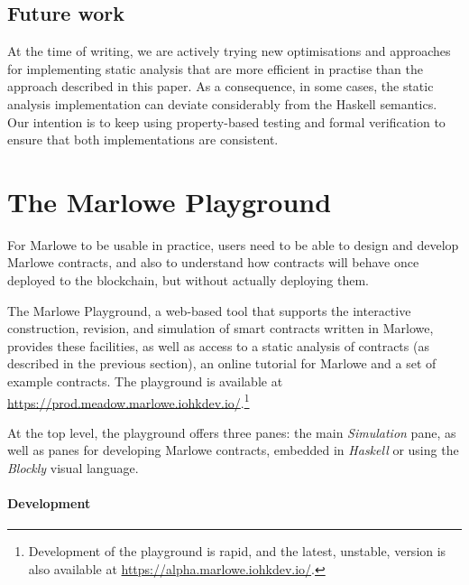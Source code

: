 \documentclass[runningheads]{llncs}
\begin{document}
\subsection{Future work}

At the time of writing, we are actively trying new optimisations and approaches for implementing static analysis that are more efficient in practise than the approach described in this paper. As a consequence, in some cases, the static analysis implementation can deviate considerably from the Haskell semantics. Our intention is to keep using property-based testing and formal verification to ensure that both implementations are consistent.

\section{The Marlowe Playground}
\label{sec:playground}

For Marlowe to be usable in practice, users need to be able to design and develop Marlowe contracts, and also to understand how contracts will behave once deployed to the blockchain, but without actually deploying them.

The Marlowe Playground, a web-based tool that supports the interactive construction, revision, and simulation of smart contracts written in Marlowe, provides these facilities, as well as access to a static analysis of contracts (as described in the previous section), an online tutorial for Marlowe and a set of example contracts. The playground is available at \url{https://prod.meadow.marlowe.iohkdev.io/}.\footnote{Development of the playground is rapid, and the latest, unstable, version is also available at \url{https://alpha.marlowe.iohkdev.io/}.}

At the top level, the playground offers three panes: the main \emph{Simulation} pane, as well as panes for developing Marlowe contracts, embedded in \emph{Haskell} or using the \emph{Blockly} visual language.

\paragraph{Development}
\end{document}
